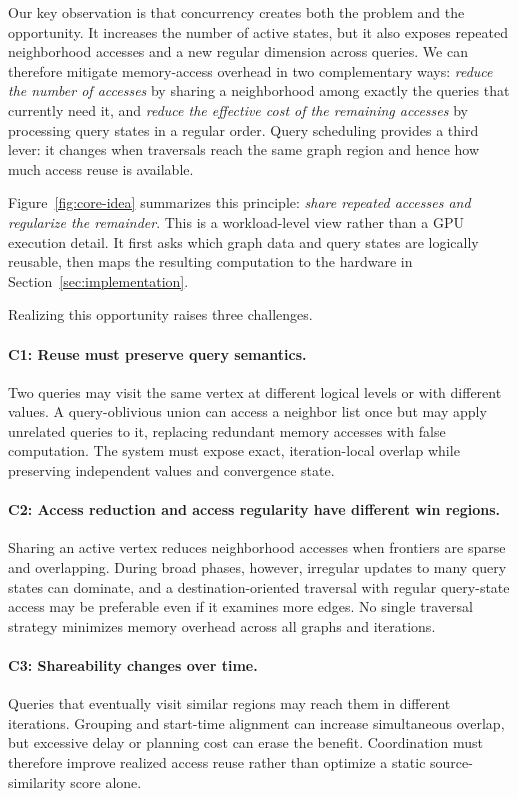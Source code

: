 Our key observation is that concurrency creates both the problem and the opportunity.  It increases the number of active states, but it also exposes repeated neighborhood accesses and a new regular dimension across queries.  We can therefore mitigate memory-access overhead in two complementary ways: \emph{reduce the number of accesses} by sharing a neighborhood among exactly the queries that currently need it, and \emph{reduce the effective cost of the remaining accesses} by processing query states in a regular order.  Query scheduling provides a third lever: it changes when traversals reach the same graph region and hence how much access reuse is available.

Figure~\ref{fig:core-idea} summarizes this principle: \emph{share repeated accesses and regularize the remainder}.  This is a workload-level view rather than a GPU execution detail.  It first asks which graph data and query states are logically reusable, then maps the resulting computation to the hardware in Section~\ref{sec:implementation}.



Realizing this opportunity raises three challenges.

\paragraph{C1: Reuse must preserve query semantics.}
Two queries may visit the same vertex at different logical levels or with different values.  A query-oblivious union can access a neighbor list once but may apply unrelated queries to it, replacing redundant memory accesses with false computation.  The system must expose exact, iteration-local overlap while preserving independent values and convergence state.

\paragraph{C2: Access reduction and access regularity have different win regions.}
Sharing an active vertex reduces neighborhood accesses when frontiers are sparse and overlapping.  During broad phases, however, irregular updates to many query states can dominate, and a destination-oriented traversal with regular query-state access may be preferable even if it examines more edges.  No single traversal strategy minimizes memory overhead across all graphs and iterations.

\paragraph{C3: Shareability changes over time.}
Queries that eventually visit similar regions may reach them in different iterations.  Grouping and start-time alignment can increase simultaneous overlap, but excessive delay or planning cost can erase the benefit.  Coordination must therefore improve realized access reuse rather than optimize a static source-similarity score alone.


